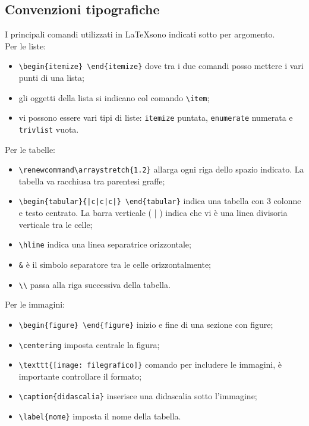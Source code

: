 \documentclass[12pt,a4paper,titlepage]{article}
\begin{document}
\subsection{Convenzioni tipografiche}
I principali comandi utilizzati in \LaTeX sono indicati sotto per argomento.\\ Per le liste:
\begin{itemize}
	\item \verb=\begin{itemize} \end{itemize}= dove tra i due comandi posso mettere i vari punti di una lista;
	\item gli oggetti della lista si indicano col comando \verb=\item=;
	\item vi possono essere vari tipi di liste: \verb|itemize| puntata, \verb|enumerate| numerata e \verb|trivlist| vuota.
\end{itemize}
Per le tabelle:
\begin{itemize}
	\item \verb|\renewcommand\arraystretch{1.2}| allarga ogni riga dello spazio indicato. La tabella va racchiusa tra parentesi graffe;
	\item \verb=\begin{tabular}{|c|c|c|} \end{tabular}= indica una tabella con 3 colonne e testo centrato. La barra verticale ( | ) indica che vi è una linea divisoria verticale tra le celle;
	\item \verb|\hline| indica una linea separatrice orizzontale;
	\item \verb|&| è il simbolo separatore tra le celle orizzontalmente;
	\item \verb|\\| passa alla riga successiva della tabella.
\end{itemize}
Per le immagini:
\begin{itemize}
	\item \verb|\begin{figure} \end{figure}| inizio e fine di una sezione con figure;
	\item \verb|\centering| imposta centrale la figura;
	\item \verb|\texttt{[image: filegrafico]}| comando per includere le immagini, è importante controllare il formato;
	\item \verb|\caption{didascalia}| inserisce una didascalia sotto l'immagine;
	\item \verb|\label{nome}| imposta il nome della tabella.
\end{itemize} 
 
\end{document}
